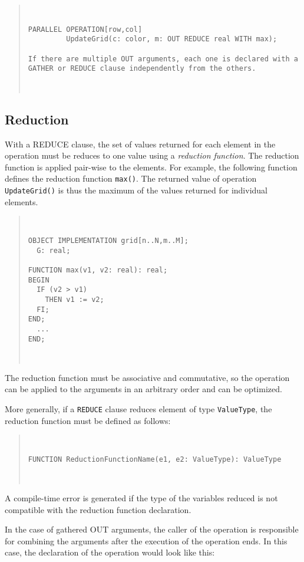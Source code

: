 \documentclass{article}
\newenvironment{example}
  {\begin{quote} ~\hrulefill }
  {~\hrulefill \end{quote} }
\begin{document}
\begin{example}
\begin{verbatim}
PARALLEL OPERATION[row,col]
         UpdateGrid(c: color, m: OUT REDUCE real WITH max);

If there are multiple OUT arguments, each one is declared with a
GATHER or REDUCE clause independently from the others.
\end{verbatim}
\end{example}

\subsection{Reduction}
\label{reduction}

With a REDUCE clause, the set of values returned for each element in
the operation must be reduces to one value using a {\em reduction
function}. The reduction function is applied pair-wise to the
elements. For example, the following function defines the reduction
function \verb+max()+. The returned value of operation
\verb+UpdateGrid()+ is thus the maximum of the values returned for
individual elements.

\begin{example} \begin{verbatim}
OBJECT IMPLEMENTATION grid[n..N,m..M];
  G: real; 

FUNCTION max(v1, v2: real): real;
BEGIN 
  IF (v2 > v1) 
    THEN v1 := v2;
  FI;
END; 
  ...
END; 
\end{verbatim} \end{example}

The reduction function must be associative and commutative, so the
operation can be applied to the arguments in an arbitrary order and
can be optimized. 

More generally, if a \verb+REDUCE+ clause reduces element of type
\verb+ValueType+, the reduction function must be defined as follows:

\begin{example} \begin{verbatim}
FUNCTION ReductionFunctionName(e1, e2: ValueType): ValueType
\end{verbatim} \end{example}

A compile-time error is generated if the type of the variables reduced
is not compatible with the reduction function declaration.


In the case of gathered OUT arguments, the caller of the operation is
responsible for combining the arguments after the execution of the
operation ends. In this case, the declaration of the operation would
look like this:
\end{document}
